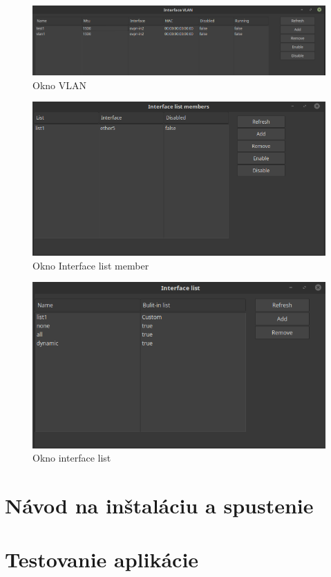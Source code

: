 \begin{figure}[H]
\centering
\includegraphics[scale=0.35]{../text/vlangui.png}
\caption{Okno VLAN}
\label{fig:vlangui}
\end{figure}
\begin{figure}[H]
\centering
\includegraphics[scale=0.35]{../text/ifacelistmember.png}
\caption{Okno Interface list member}
\label{fig:interfacelistmembergui}
\end{figure}
\begin{figure}[H]
\centering
\includegraphics[scale=0.45]{../text/ifacelist.png}
\caption{Okno interface list}
\label{fig:interfacelistgui}
\end{figure}
\chapter{Návod na inštaláciu a spustenie}
\chapter{Testovanie aplikácie}


